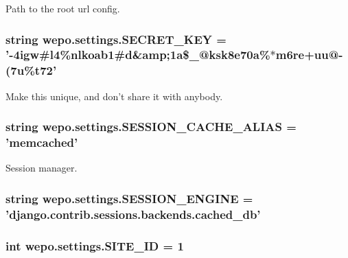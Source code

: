 Path to the root url config. 

\hypertarget{namespacewepo_1_1settings_a461b9adbf4543b4d1b51c833cd0612d3}{
\subsubsection[{S\-E\-C\-R\-E\-T\-\_\-\-K\-E\-Y}]{\setlength{\rightskip}{0pt plus 5cm}string wepo.\-settings.\-S\-E\-C\-R\-E\-T\-\_\-\-K\-E\-Y = '-\/4igw\#l4\%nlkoab1\#d\&amp;1a\$\-\_\-@ksk8e70a\%$\ast$m6re+uu@-\/(7u\%t72'}}\label{namespacewepo_1_1settings_a461b9adbf4543b4d1b51c833cd0612d3}


Make this unique, and don't share it with anybody. 

\hypertarget{namespacewepo_1_1settings_aff76d22872cecda4226a3ae6fe520bbd}{
\subsubsection[{S\-E\-S\-S\-I\-O\-N\-\_\-\-C\-A\-C\-H\-E\-\_\-\-A\-L\-I\-A\-S}]{\setlength{\rightskip}{0pt plus 5cm}string wepo.\-settings.\-S\-E\-S\-S\-I\-O\-N\-\_\-\-C\-A\-C\-H\-E\-\_\-\-A\-L\-I\-A\-S = 'memcached'}}\label{namespacewepo_1_1settings_aff76d22872cecda4226a3ae6fe520bbd}


Session manager. 

\hypertarget{namespacewepo_1_1settings_a6072380d2a207c0a2973b979bffd01e9}{
\subsubsection[{S\-E\-S\-S\-I\-O\-N\-\_\-\-E\-N\-G\-I\-N\-E}]{\setlength{\rightskip}{0pt plus 5cm}string wepo.\-settings.\-S\-E\-S\-S\-I\-O\-N\-\_\-\-E\-N\-G\-I\-N\-E = 'django.\-contrib.\-sessions.\-backends.\-cached\-\_\-db'}}\label{namespacewepo_1_1settings_a6072380d2a207c0a2973b979bffd01e9}
\hypertarget{namespacewepo_1_1settings_ab614d9076e4b5c83effad84ceb10f752}{
\subsubsection[{S\-I\-T\-E\-\_\-\-I\-D}]{\setlength{\rightskip}{0pt plus 5cm}int wepo.\-settings.\-S\-I\-T\-E\-\_\-\-I\-D = 1}}\label{namespacewepo_1_1settings_ab614d9076e4b5c83effad84ceb10f752}


